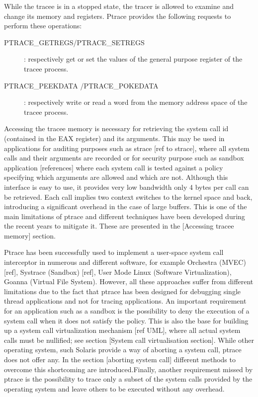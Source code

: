 While the tracee is in a stopped state, the tracer is allowed to examine and change its memory and registers. Ptrace provides the following requests to perform these operations: \\

\begin{description}
\item[PTRACE\_GETREGS/PTRACE\_SETREGS] :
	respectively get or set the values of the general purpose register of the tracee process.
\item[PTRACE\_PEEKDATA /PTRACE\_POKEDATA] :
	 respectively write or read a word from the memory address space of the tracee process.
\end{description}

Accessing the tracee memory is necessary for retrieving the system call id (contained in the EAX register) and its arguments. This may be used in applications for auditing purposes such as strace [ref to strace], where all system calls and their arguments are recorded or for security purpose such as sandbox application [references] where each system call is tested against a policy specifying which arguments are allowed and which are not.   Although this interface is easy to use, it provides very low bandwidth only 4 bytes per call can be retrieved. Each call implies two context switches to the kernel space and back, introducing a significant overhead in the case of large buffers.  This is one of the main limitations of ptrace and different techniques have been developed during the recent years to mitigate it. These are presented in the [Accessing tracee memory] section.

Ptrace has been successfully used to implement a user-space system call interceptor in numerous and different software, for example Orchestra (MVEC) [ref], Systrace (Sandbox) [ref], User Mode Linux (Software Virtualization), Goanna (Virtual File System). However, all these approaches suffer from different limitations due to the fact that ptrace has been designed for debugging single thread applications and not for tracing applications.  An important requirement for an application such as a sandbox is the possibility to deny the execution of a system call when it does not satisfy the policy. This is also the base for building up a system call virtualization mechanism [ref UML], where all actual system calls must be nullified; see section [System call virtualisation section]. While other operating system, such Solaris provide a way of aborting a system call, ptrace does not offer any.  In the section [aborting system call] different methods to overcome this shortcoming are introduced.Finally, another requirement missed by ptrace is the possibility to trace only a subset of the system calls provided by the operating system and leave others to be executed without any overhead. 

